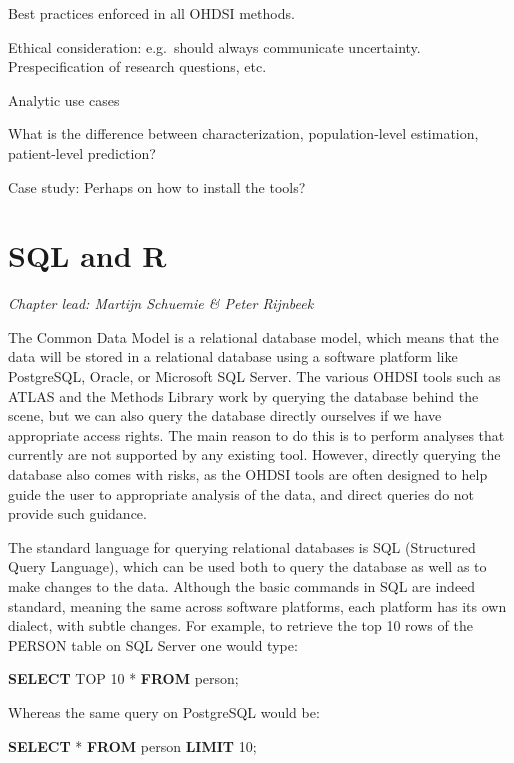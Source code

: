 \documentclass[11pt]{book}
\newenvironment{Shaded}{\begin{snugshade}}{\end{snugshade}}
\newcommand{\KeywordTok}[1]{\textcolor[rgb]{0.13,0.29,0.53}{\textbf{#1}}}
\newcommand{\DecValTok}[1]{\textcolor[rgb]{0.00,0.00,0.81}{#1}}
\newcommand{\NormalTok}[1]{#1}
\begin{document}
Best practices enforced in all OHDSI methods.

Ethical consideration: e.g.~should always communicate uncertainty.
Prespecification of research questions, etc.

Analytic use cases

What is the difference between characterization, population-level
estimation, patient-level prediction?

Case study: Perhaps on how to install the tools?

\chapter{SQL and R}\label{SqlAndR}

\emph{Chapter lead: Martijn Schuemie \& Peter Rijnbeek}

The Common Data Model is a relational database model, which means that
the data will be stored in a relational database using a software
platform like PostgreSQL, Oracle, or Microsoft SQL Server. The various
OHDSI tools such as ATLAS and the Methods Library work by querying the
database behind the scene, but we can also query the database directly
ourselves if we have appropriate access rights. The main reason to do
this is to perform analyses that currently are not supported by any
existing tool. However, directly querying the database also comes with
risks, as the OHDSI tools are often designed to help guide the user to
appropriate analysis of the data, and direct queries do not provide such
guidance.

The standard language for querying relational databases is SQL
(Structured Query Language), which can be used both to query the
database as well as to make changes to the data. Although the basic
commands in SQL are indeed standard, meaning the same across software
platforms, each platform has its own dialect, with subtle changes. For
example, to retrieve the top 10 rows of the PERSON table on SQL Server
one would type:

\begin{Shaded}
\begin{Highlighting}[]
\KeywordTok{SELECT}\NormalTok{ TOP }\DecValTok{10}\NormalTok{ * }\KeywordTok{FROM}\NormalTok{ person;}
\end{Highlighting}
\end{Shaded}

Whereas the same query on PostgreSQL would be:

\begin{Shaded}
\begin{Highlighting}[]
\KeywordTok{SELECT}\NormalTok{ * }\KeywordTok{FROM}\NormalTok{ person }\KeywordTok{LIMIT} \DecValTok{10}\NormalTok{;}
\end{Highlighting}
\end{Shaded}
\end{document}
